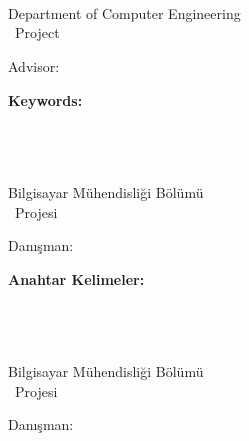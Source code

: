     \listoftables
\fi


\ifnum{}
\ifnum{}
\newpage
\chapter*{\eabstract}

\begin{center}
{\bfseries \Large\titleEN}

\studenti \\ \studentii

Department of Computer Engineering \\ {\degree~Project}

Advisor: \advisorEN

\end{center}

\abstractTextEnglish

{\bfseries Keywords:} \abstractKeywordsEnglish


\newpage
\chapter*{\tabstract}

\begin{center}
{\bfseries \Large\titleTR}

\studenti \\ \studentii

Bilgisayar Mühendisliği Bölümü \\ {\tdegree~Projesi}

Danışman: \advisorTR

\end{center}

\abstractTextTurkish

{\bfseries Anahtar Kelimeler:} \abstractKeywordsTurkish

\else
\newpage
\chapter*{\tabstract}

\begin{center}
{\bfseries \Large\titleTR}

\studenti \\ \studentii

Bilgisayar Mühendisliği Bölümü \\ {\tdegree~Projesi}

Danışman: \advisorTR

\end{center}

